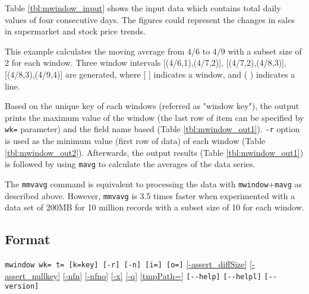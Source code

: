 \begin{table}[htbp]
\begin{center}
\begin{tabular}{ccc}



\end{tabular}
\end{center}
\end{table}


Table \ref{tbl:mwindow_input} shows the input data which contains total daily values of four consecutive days. The figures could represent the changes in sales in supermarket and stock price trends. 

This example calculates the moving average from 4/6 to 4/9 with a subset size of 2 for each window. Three window intervals [(4/6,1),(4/7,2)], [(4/7,2),(4/8,3)], [(4/8,3),(4/9,4)] are generated, where [ ] indicates a window, and ( ) indicates a line.  

Based on the unique key of each windows (referred as "window key"), the output prints the maximum value of the window (the last row of item can be specified by \verb|wk=| parameter) and the field name based (Table \ref{tbl:mwindow_out1}).  
\verb|-r| option is used as the minimum value (first row of data) of each window (Table \ref{tbl:mwindow_out2}). Afterwards, the output results (Table \ref{tbl:mwindow_out1}) is followed by using \verb|mavg| to calculate the averages of the data series. 

The \verb|mmvavg| command is equivalent to processing the data with \verb|mwindow|+\verb|mavg| as described above. However, \verb|mmvavg| is  3.5 times faster when experimented with a data set of 200MB for 10 million records with a subset size of 10 for each window. 

\subsection*{Format}
\verb|mwindow wk= t= [k=key] [-r] [-n] [i=] [o=]|
\hyperref[sect:option_assert_diffSize]{[-assert\_diffSize]}
\hyperref[sect:option_assert_nullkey]{[-assert\_nullkey]}
\hyperref[sect:option_nfn]{[-nfn]} 
\hyperref[sect:option_nfno]{[-nfno]}  
\hyperref[sect:option_x]{[-x]}
\hyperref[sect:option_q]{[-q]}
\hyperref[sect:option_option_tmppath]{[tmpPath=]}
\verb|[--help]|
\verb|[--helpl]|
\verb|[--version]|\\


